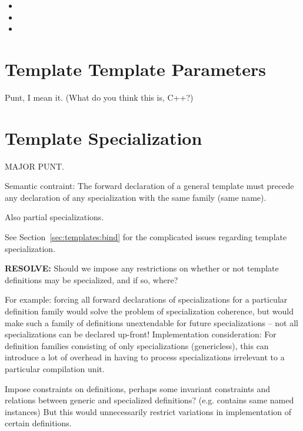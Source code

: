 \begin{itemize}
\item {}
\item {}
\item {}
\end{itemize}


\section{Template Template Parameters}
\label{sec:templates:ttp}

Punt, I mean it.  
(What do you think this is, C++?)

\section{Template Specialization}
\label{sec:templates:spec}

MAJOR PUNT.

Semantic contraint:
The forward declaration of a general template must precede any declaration
of any specialization with the same family (same name).  

Also partial specializations.  

See Section~\ref{sec:templates:bind} for the complicated issues regarding
template specialization.  

\textbf{RESOLVE:}
Should we impose any restrictions on whether or not template definitions
may be specialized, and if so, where?  

For example: forcing all forward declarations of specializations for 
a particular definition family would solve the problem of 
specialization coherence, but would make such a family of definitions
unextendable for future specializations -- not all specializations
can be declared up-front!  
Implementation consideration:
For definition families consisting of only specializations (genericless),
this can introduce a lot of overhead in having to process specializations
irrelevant to a particular compilation unit.  

Impose constraints on definitions, perhaps some invariant constraints and
relations between generic and specialized definitions?  (e.g. contains same
named instances)  But this would unnecessarily restrict variations in
implementation of certain definitions.  

